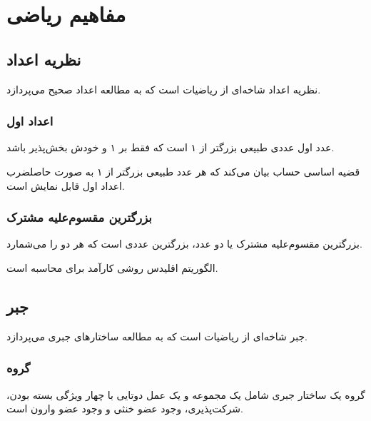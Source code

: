\documentclass{matinbook}
\begin{document}
\chapter{مفاهیم ریاضی}

\section{نظریه اعداد}

نظریه اعداد شاخه‌ای از
ریاضیات است که به مطالعه
اعداد صحیح می‌پردازد.

\subsection{اعداد اول}

عدد اول عددی طبیعی بزرگتر از ۱
است که فقط بر ۱ و خودش بخش‌پذیر باشد.

قضیه اساسی حساب
بیان می‌کند که هر عدد طبیعی بزرگتر از ۱
به صورت حاصلضرب اعداد اول
قابل نمایش است.

\subsection{بزرگترین مقسوم‌علیه مشترک}

بزرگترین مقسوم‌علیه مشترک
یا 
دو عدد، بزرگترین عددی است که هر دو را می‌شمارد.

الگوریتم اقلیدس
روشی کارآمد برای محاسبه  است.

\section{جبر}

جبر شاخه‌ای از ریاضیات است
که به مطالعه ساختارهای جبری
می‌پردازد.

\subsection{گروه}

گروه یک ساختار جبری شامل
یک مجموعه و یک عمل دوتایی
با چهار ویژگی بسته بودن،
شرکت‌پذیری،
وجود عضو خنثی و
وجود عضو وارون است.
\end{document}

